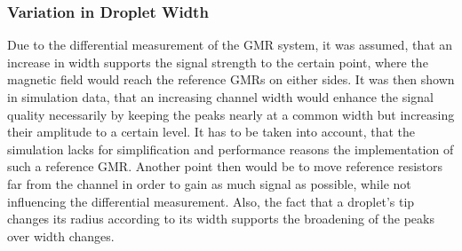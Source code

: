 \subsubsection{Variation in Droplet Width}
Due to the differential measurement of the GMR system, it was assumed, that an increase in width supports the signal strength to the certain point, where the magnetic field would reach the reference GMRs on either sides. It was then shown in simulation data, that an increasing channel width would enhance the signal quality necessarily by keeping the peaks nearly at a common width but increasing their amplitude to a certain level.
It has to be taken into account, that the simulation lacks for simplification and performance reasons the implementation of such a reference GMR. Another point then would be to move reference resistors far from the channel in order to gain as much signal as possible, while not influencing the differential measurement.
Also, the fact that a droplet's tip changes its radius according to its width supports the broadening of the peaks over width changes.

